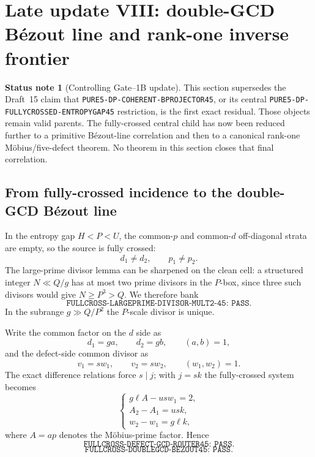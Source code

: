 \documentclass[11pt]{article}
\theoremstyle{definition}
\newtheorem{status}[status]{Status note}
\newcommand{\1}{\mathbf 1}
\begin{document}
\section{Late update VIII: double-GCD B\'ezout line and rank-one inverse frontier}
\label{app:rankone-bezout}

\begin{status}[Controlling Gate--1B update]
This section supersedes the Draft~15 claim that
\texttt{PURE5-DP-COHERENT-BPROJECTOR45}, or its central
\texttt{PURE5-DP-FULLYCROSSED-ENTROPYGAP45} restriction, is the first exact
residual.  Those objects remain valid parents.  The fully-crossed central child
has now been reduced further to a primitive B\'ezout-line correlation and then
to a canonical rank-one M\"obius/five-defect theorem.  No theorem in this
section closes that final correlation.
\end{status}

\subsection{From fully-crossed incidence to the double-GCD B\'ezout line}
In the entropy gap $H<P<U$, the common-$p$ and common-$d$ off-diagonal
strata are empty, so the source is fully crossed:
\[
 d_1\neq d_2,\qquad p_1\neq p_2.
\]
The large-prime divisor lemma can be sharpened on the clean cell: a structured
integer $N\ll Q/g$ has at most two prime divisors in the $P$-box, since three
such divisors would give $N\ge P^3>Q$.  We therefore bank
\[
 \boxed{\texttt{FULLCROSS-LARGEPRIME-DIVISOR-MULT2-45: PASS}}.
\]
In the subrange $g\gg Q/P^2$ the $P$-scale divisor is unique.

Write the common factor on the $d$ side as
\[
 d_1=ga,\qquad d_2=gb,\qquad (a,b)=1,
\]
and the defect-side common divisor as
\[
 v_1=sw_1,\qquad v_2=sw_2,\qquad (w_1,w_2)=1.
\]
The exact difference relations force $s\mid j$; with $j=sk$ the fully-crossed
system becomes
\begin{equation}
 \boxed{
 \begin{cases}
  g\ell A-usw_1=2,\\
  A_2-A_1=usk,\\
  w_2-w_1=g\ell k,
 \end{cases}}
 \label{eq:d16-doublegcd-system}
\end{equation}
where $A=ap$ denotes the M\"obius-prime factor.  Hence
\[
 \boxed{\texttt{FULLCROSS-DEFECT-GCD-ROUTER45: PASS}}.
\]
\[
 \boxed{\texttt{FULLCROSS-DOUBLEGCD-BEZOUT45: PASS}}.
\]
\end{document}
